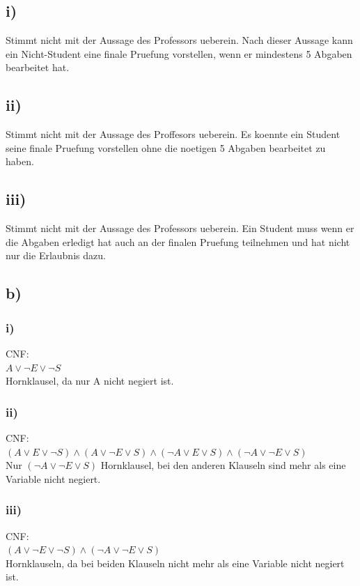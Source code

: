 \documentclass[a4paper]{scrartcl}
\begin{document}
\subsection*{i)}
Stimmt nicht mit der Aussage des Professors ueberein. Nach dieser Aussage kann ein Nicht-Student eine finale Pruefung vorstellen, wenn er mindestens 5 Abgaben bearbeitet hat.\\
\subsection*{ii)}
Stimmt nicht mit der Aussage des Proffesors ueberein. Es koennte ein Student seine finale Pruefung vorstellen ohne die noetigen 5 Abgaben bearbeitet zu haben.\\
\subsection*{iii)}
Stimmt nicht mit der Aussage des Professors ueberein. Ein Student muss wenn er die Abgaben erledigt hat auch an der finalen Pruefung teilnehmen und hat nicht nur die Erlaubnis dazu.\\ 

\subsection*{b)}
\subsubsection*{i)}
CNF:\\
$A \lor \neg E \lor \neg S$\\
Hornklausel, da nur A nicht negiert ist.\\

\subsubsection*{ii)}
CNF:\\
$(A \lor E \lor \neg S) \land (A \lor \neg E \lor S) \land (\neg A \lor E \lor S) \land (\neg A \lor \neg E \lor S)$\\
Nur $(\neg A \lor \neg E \lor S)$ Hornklausel, bei den anderen Klauseln sind mehr als eine Variable nicht negiert.\\
\subsubsection*{iii)}
CNF:\\
$(A \lor \neg E \lor \neg S) \land (\neg A \lor \neg E \lor S)$\\
Hornklauseln, da bei beiden Klauseln nicht mehr als eine Variable nicht negiert ist.\\
\end{document}
